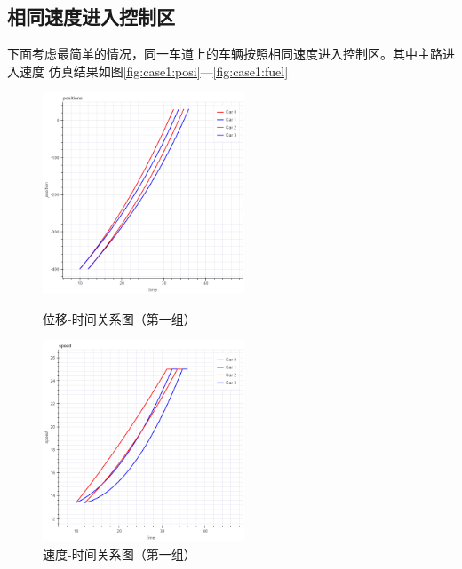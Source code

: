 \subsection{相同速度进入控制区}
下面考虑最简单的情况，同一车道上的车辆按照相同速度进入控制区。其中主路进入速度
仿真结果如图\ref{fig:case1:posi}---\ref{fig:case1:fuel}
\begin{figure}
\begin{minipage}{0.48\textwidth}
  \centering
  \includegraphics[height=6cm]{figures/sim_case1/posi.png}
  \caption{位移-时间关系图（第一组）}
  \label{fig:case1:posi}
\end{minipage}\hfill
\begin{minipage}{0.48\textwidth}
  \centering
  \includegraphics[height=6cm]{figures/sim_case1/speed.png}
  \caption{速度-时间关系图（第一组）}
  \label{fig:case1:speed}
\end{minipage}
\end{figure}
